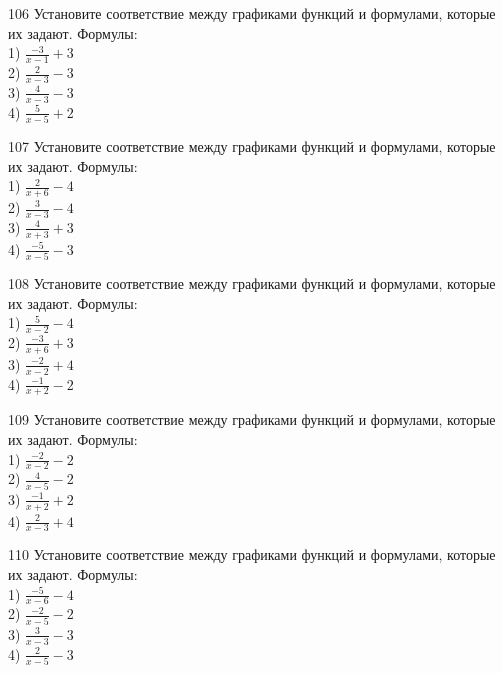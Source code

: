 \documentclass[4apaper]{article}
\begin{document}
\begin{taskBN}{106}
Установите соответствие между графиками функций и формулами, которые их задают. Формулы: \\1) $\frac{-3}{x-1}+3$\\2) $\frac{2}{x-3}-3$\\3) $\frac{4}{x-3}-3$\\4) $\frac{5}{x-5}+2$
\end{taskBN}

\begin{taskBN}{107}
Установите соответствие между графиками функций и формулами, которые их задают. Формулы: \\1) $\frac{2}{x+6}-4$\\2) $\frac{3}{x-3}-4$\\3) $\frac{4}{x+3}+3$\\4) $\frac{-5}{x-5}-3$
\end{taskBN}

\begin{taskBN}{108}
Установите соответствие между графиками функций и формулами, которые их задают. Формулы: \\1) $\frac{5}{x-2}-4$\\2) $\frac{-3}{x+6}+3$\\3) $\frac{-2}{x-2}+4$\\4) $\frac{-1}{x+2}-2$
\end{taskBN}

\begin{taskBN}{109}
Установите соответствие между графиками функций и формулами, которые их задают. Формулы: \\1) $\frac{-2}{x-2}-2$\\2) $\frac{4}{x-5}-2$\\3) $\frac{-1}{x+2}+2$\\4) $\frac{2}{x-3}+4$
\end{taskBN}

\begin{taskBN}{110}
Установите соответствие между графиками функций и формулами, которые их задают. Формулы: \\1) $\frac{-5}{x-6}-4$\\2) $\frac{-2}{x-5}-2$\\3) $\frac{3}{x-3}-3$\\4) $\frac{2}{x-5}-3$
\end{taskBN}
\end{document}
